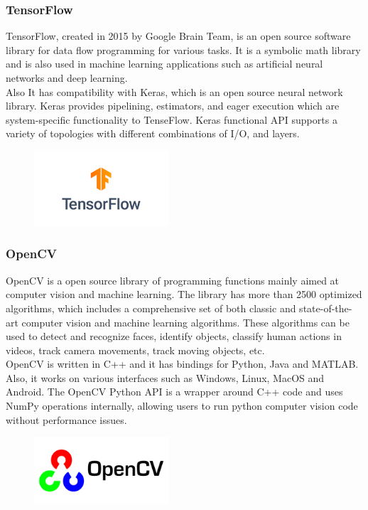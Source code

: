 \documentclass[conference]{IEEEtran}
\begin{document}
\subsubsection{TensorFlow}
TensorFlow, created in 2015 by Google Brain Team, is an open source software library for data flow programming for various tasks. It is a symbolic math library and is also used in machine learning applications such as artificial neural networks and deep learning. \\
Also It has compatibility with Keras, which is an open source neural network library. Keras provides pipelining, estimators, and eager execution which are system-specific functionality to TenseFlow. Keras functional API supports a variety of topologies with different combinations of I/O, and layers. \\
\begin{figure}[h!]
\centering
\includegraphics[width=5cm]{imagefolder/tensor.png}
\caption{}
\label{fig:map}
\end{figure}

\subsubsection{OpenCV}
OpenCV is a open source library of programming functions mainly aimed at computer vision and machine learning. The library has more than 2500 optimized algorithms, which includes a comprehensive set of both classic and state-of-the-art computer vision and machine learning algorithms. These algorithms can be used to detect and recognize faces, identify objects, classify human actions in videos, track camera movements, track moving objects, etc.\\ 
OpenCV is written in C++ and it has bindings for Python, Java and MATLAB. Also, it works on various interfaces such as Windows, Linux, MacOS and Android. The OpenCV Python API is a wrapper around C++ code and uses NumPy operations internally, allowing users to run python computer vision code without performance issues. \\


\begin{figure}[hbt!]
\includegraphics[width=5cm]{imagefolder/opencv.png}
\caption{}
\label{fig:map}
\end{figure}
\end{document}

